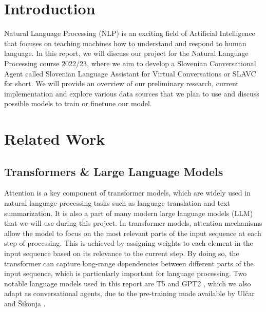 \documentclass[fleqn,moreauthors,10pt]{ds_report}
\affiliation{\textit{Advisors: doc. dr. Slavko Žitnik}}
\begin{document}
\flushbottom 

\maketitle 

\thispagestyle{empty} 

\section*{Introduction}
	Natural Language Processing (NLP) is an exciting field of Artificial Intelligence that focuses on teaching machines how to understand and respond to human language. 
    In this report, we will discuss our project for the Natural Language Processing course 2022/23, where we aim to develop a Slovenian Conversational Agent called Slovenian Language Assistant for Virtual Conversations  or SLAVC for short.
    We will provide an overview of our preliminary research, current implementation and explore various data sources that we plan to use and discuss possible models to train or finetune our model.

\section*{Related Work}

\subsection*{Transformers \& Large Language Models}
Attention \cite{vaswani2017attention} is a key component of transformer models, which are widely used in natural language processing tasks such as language translation and text summarization.
It is also a part of many modern large language models (LLM) that we will use during this project.
In transformer models, attention mechanisms allow the model to focus on the most relevant parts of the input sequence at each step of processing.
This is achieved by assigning weights to each element in the input sequence based on its relevance to the current step.
By doing so, the transformer can capture long-range dependencies between different parts of the input sequence, which is particularly important for language processing. Two notable language models used in this report are T5 \cite{DBLP:journals/corr/abs-1910-10683} and GPT2 \cite{radford2019language}, which we also adapt as conversational agents, due to the pre-training made available by Ulčar and Šikonja \cite{ulčar2023sequence}. 
\end{document}

